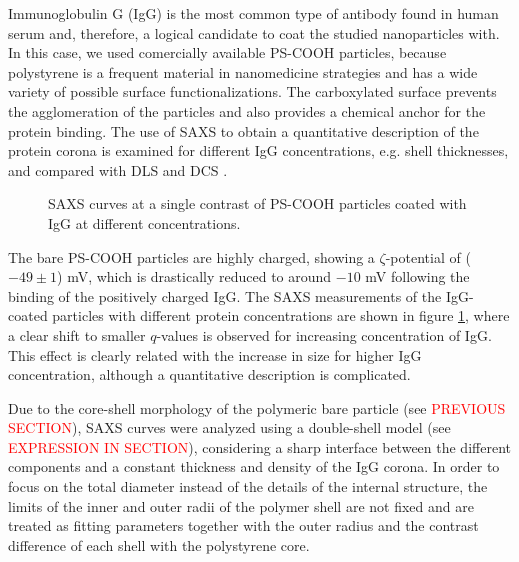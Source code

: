 Immunoglobulin G (IgG) is the most common type of antibody found in human serum and, therefore, a logical candidate to coat the studied nanoparticles with. In this case, we used comercially available PS-COOH particles, because polystyrene is a frequent material in nanomedicine strategies and has a wide variety of possible surface functionalizations. The carboxylated surface prevents the agglomeration of the particles and also provides a chemical anchor for the protein binding. The use of SAXS to obtain a quantitative description of the protein corona is examined for different IgG concentrations, e.g. shell thicknesses, and compared with DLS and DCS \cite{minelli_characterization_2014}.

\begin{figure}
	\centering
		
		\caption{SAXS curves at a single contrast of PS-COOH particles coated with IgG at different concentrations.}
		\label{fig:CoatedKiskerIgGSingleContrastSAXS}
\end{figure}

The bare PS-COOH particles are highly charged, showing a $\zeta$-potential of ($-49 \pm 1$) mV, which is drastically reduced to around $ -10$ mV following the binding of the positively charged IgG. The SAXS measurements of the IgG-coated particles with different protein concentrations are shown in figure \ref{fig:CoatedKiskerIgGSingleContrastSAXS}, where a clear shift to smaller $q$-values is observed for increasing concentration of IgG. This effect is clearly related with the increase in size for higher IgG concentration, although a quantitative description is complicated.

Due to the core-shell morphology of the polymeric bare particle (see \textcolor{red}{PREVIOUS SECTION}), SAXS curves were analyzed using a double-shell model (see \textcolor{red}{EXPRESSION IN SECTION}), considering a sharp interface between the different components and a constant thickness and density of the IgG corona. In order to focus on the total diameter instead of the details of the internal structure, the limits of the inner and outer radii of the polymer shell are not fixed and are treated as fitting parameters together with the outer radius and the contrast difference of each shell with the polystyrene core.

